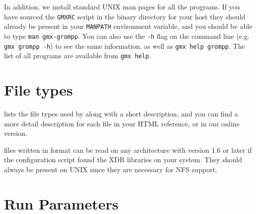 In addition, we install standard UNIX man pages for all the programs. If
you have sourced the {\tt GMXRC} script in the {\gromacs} binary directory for
your host they should already be present in your {\tt MANPATH} environment variable, and you
should be able to type {\eg} {\tt man gmx-grompp}. You can also use
the {\tt -h} flag on the command line (e.g. {\tt gmx grompp -h}) to
see the same information, as well as {\tt gmx help grompp}.
The list of all programs are available from {\tt gmx help}.

\section{File types}
\label{sec:fileformats}
 lists the file types used by {\gromacs} along with
a short description, and you can find a more detail description for
each file in your HTML reference, or in our online version.

{\gromacs} files written in  format can be read on any
architecture with {\gromacs} version 1.6 or later if the configuration
script found the XDR libraries on your system. They should always be
present on UNIX since they are necessary for NFS support.



\section{Run Parameters}


